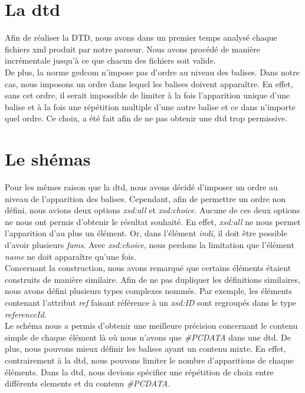 \documentclass[12pt,a4paper]{article}
\begin{document}
\section{La dtd}

Afin de réaliser la DTD, nous avons dans un premier temps analysé chaque fichiers
xml produit par notre parseur. Nous avons procédé de manière incrémentale jusqu'à
ce que chacun des fichiers soit valide.\\
De plus, la norme gedcom n'impose pas d'ordre au niveau des balises. Dans notre
cas, nous imposons un ordre dans lequel les balises doivent apparaître. En effet,
sans cet ordre, il serait impossible de limiter à la fois l'apparition unique d'une
balise et à la fois une répétition multiple d'une autre balise et ce dans n'importe
quel ordre. Ce choix, a été fait afin de ne pas obtenir une dtd trop permissive.


\section{Le shémas}

Pour les mêmes raison que la dtd, nous avons décidé d'imposer un ordre au niveau de l'apparition
des balises. Cependant, afin de permettre un ordre non défini, nous avions deux options
\emph{xsd:all} et \emph{xsd:choice}. Aucune de ces deux options ne nous ont permis d'obtenir le résultat
souhaité. En effet, \emph{xsd:all} ne nous permet l'apparition d'au plus 
un élément. Or, dans l’élément \emph{indi}, il doit être possible d'avoir
plusieurs \emph{fams}. Avec \emph{xsd:choice}, nous perdons la limitation que l’élément
\emph{name} ne doit apparaître qu'une fois.\\

Concernant la construction, nous avons remarqué que certains éléments étaient
construits de manière similaire. Afin de ne pas dupliquer les définitions 
similaires, nous avons défini plusieurs types complexes nommés.
Par exemple, les éléments contenant l'attribut \emph{ref} faisant référence à un 
\emph{xsd:ID} sont regroupés dans le type \emph{referenceId}.\\

Le schéma nous a permis d'obtenir une meilleure précision concernant le 
contenu simple de chaque élément là où nous n'avons que \emph{\#PCDATA} dans 
une dtd. De plus, nous pouvons mieux définir les balises ayant un contenu mixte.
En effet, contrairement à la dtd, nous pouvons limiter le nombre d'apparitions 
de chaque éléments. Dans la dtd, nous devions spécifier une répétition de choix 
entre différents elements et du contenu \emph{\#PCDATA}. 
\end{document}

